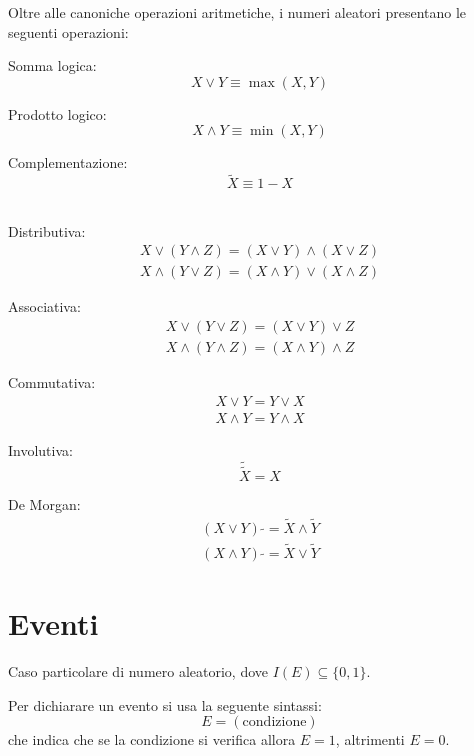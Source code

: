 \begin{definition}
  Oltre alle canoniche operazioni aritmetiche, i numeri aleatori presentano le seguenti operazioni:

  Somma logica:
  \[ X \vee Y \equiv \max(X,Y) \]

  Prodotto logico:
  \[ X \wedge Y \equiv \min(X,Y) \]

  Complementazione:
  \[ \tilde{X} \equiv 1 - X \]
\end{definition}

\begin{definition}{\ \\} %
  Distributiva:
  \begin{align*}
    X \vee (Y \wedge Z) = (X \vee Y) \wedge (X \vee Z) \\
    X \wedge (Y \vee Z) = (X \wedge Y) \vee (X \wedge Z)
  \end{align*}

  Associativa:
  \begin{align*}
    X \vee (Y \vee Z) = (X \vee Y) \vee Z \\
    X \wedge (Y \wedge Z) = (X \wedge Y) \wedge Z
  \end{align*}

  Commutativa:
  \begin{align*}
    X \vee Y = Y \vee X \\
    X \wedge Y = Y \wedge X
  \end{align*}

  Involutiva:
  \[ \tilde{\tilde{X}} = X \]

  De Morgan:
  \begin{align*}
    (X \vee Y) \; \tilde{} = \tilde{X} \wedge \tilde{Y} \\
    (X \wedge Y) \; \tilde{} = \tilde{X} \vee \tilde{Y}
  \end{align*}
\end{definition}


\section{Eventi} %
\begin{definition}[Evento]\label{def:evento}
  Caso particolare di numero aleatorio, dove \( I(E) \subseteq \{0,1\} \).
\end{definition}
Per dichiarare un evento si usa la seguente sintassi:
\[ E = (\text{condizione}) \]
che indica che se la condizione si verifica allora \( E = 1 \), altrimenti \( E = 0 \).

